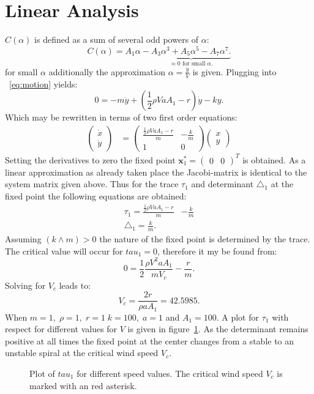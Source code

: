 \section{Linear Analysis}
$C(\alpha)$ is defined as a sum of several odd powers of $\alpha$:
\begin{equation}
C(\alpha) = A_1 \alpha - \underbrace{ A_3 \alpha^3 + A_ 5 \alpha ^5 - A_7 \alpha^7.}_\text{$\approx 0$ for small $\alpha$.} 
\end{equation}
for small $\alpha$ additionally the approximation $\alpha = \frac{\dot{y}}{V}$ is given. Plugging into ~\ref{eq:motion} yields:
\begin{equation}
0 = -m \ddot{y} + (\frac{1}{2}\rho V a A_1 -  r)\dot{y} - ky. 
\label{eq:linear}
\end{equation}
Which may be rewritten in terms of two first order equations:
\begin{align}
\begin{pmatrix}
\dot{x} \\ \dot{y} \end{pmatrix} &=
\begin{pmatrix}
	\frac{\frac{1}{2}\rho V a A_1 -  r}{m} & - \frac{k}{m}  \\ 
	1 & 0
\end{pmatrix} 
\begin{pmatrix}
x \\ y
\end{pmatrix}
\end{align}
Setting the derivatives to zero the fixed point $\mathbf{x}_1^* = \begin{pmatrix} 0 & 0 \end{pmatrix}^T$ is obtained. As a linear approximation as already taken place the Jacobi-matrix is identical to the system matrix given above. Thus for the trace $\tau_1$ and determinant $\triangle_1$ at the fixed point the following equations are obtained:
\begin{align}
\tau_1 = \frac{\frac{1}{2}\rho V a A_1 -  r}{m} & - \frac{k}{m} \\
\triangle_1 = \frac{k}{m}.
\end{align}
Assuming $(k \wedge m) > 0$ the nature of the fixed point is determined by the trace. The critical value will occur for $tau_1 = 0$, therefore it my be found from:
\begin{equation}
0 = \frac{1}{2} \frac{\rho V^2 a A_1}{mV_c} - \frac{r}{m}.
\end{equation}
Solving for $V_c$ leads to:
\begin{equation}
V_c = \frac{2r}{\rho a A_1} = 42.5985.
\end{equation}
When $m = 1, \; \rho = 1, \; r = 1 \; k = 100, \; a = 1$ and $A_1 = 100$. 
A plot for $\tau_1$ with respect for different values for $V$ is given in figure~\ref{fig:tau1}. As the determinant remains positive at all times the fixed point at the center changes from a stable to an unstable spiral at the critical wind speed $V_c$. 
\begin{figure}

\caption{Plot of $tau_1$ for different speed values. The critical wind speed $V_c$ is marked with an red asterisk.}
\label{fig:tau1}
\end{figure}

